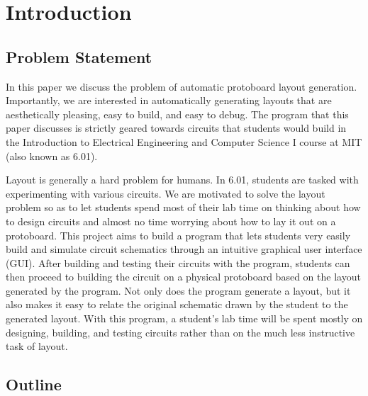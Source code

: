 

\chapter{Introduction}
\label{ch:intro}

\section{Problem Statement}

In this paper we discuss the problem of automatic protoboard layout generation.
Importantly, we are interested in automatically generating layouts that are
aesthetically pleasing, easy to build, and easy to debug. The program that this
paper discusses
is strictly geared towards circuits that students would build in the
Introduction to Electrical Engineering and Computer Science I\cite{sixohone} 
course at MIT (also known as 6.01).

Layout is generally a hard problem for humans. In 6.01, students are tasked with
experimenting with various circuits. We are motivated to solve the layout
problem so as to let students spend most of their lab time on thinking about how
to design
circuits and almost no time worrying about how to lay it out on a protoboard.
This project aims to build a program that lets students very easily build and
simulate circuit schematics through an intuitive graphical user interface (GUI).
After building and testing their circuits with the program, students can then
proceed to building the circuit on a physical protoboard based on the layout
generated by the program. Not only does the program generate a layout, but it
also makes it easy to relate the original schematic drawn by the student to the
generated layout. With this program, a student's lab time will be spent mostly
on designing, building, and testing circuits rather than on the much less
instructive task of layout.

\section{Outline}

